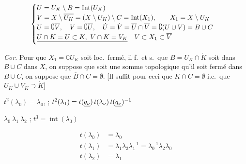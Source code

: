 \documentclass[11pt,a4paper]{article}
\begin{document}
\[
\begin{cases}
U = U_K \setminus B = \operatorname{Int}(U_K) \\
V = X \setminus \overline{U_K} = (X \setminus U_K) \setminus C = \operatorname{Int}(X_1),
\qquad X_1 = X \setminus U_K \\
U = \complement\overline{V}, \quad V = \complement\overline{U}, \quad
\dot{U} = \dot{V} = \overline{U} \cap \overline{V} = \complement(U \cup V) = B \cup C \\
\struck{U \cap K = U \subset K,\ V \cap K = V_K}\quad V \subset X_1 \subset \overline{V}
\end{cases}
\]

\emph{Cor.}  Pour que $X_1 = \complement U_K$
soit loc.\ fermé, il f.\ et s.\ que $B = U_K \cap \dot{K}$ soit
 dans
$B \cup C$ \ill{} dans $X$, \ill{} on suppose que \ill{} soit une somme
\ill{} topologique 
 qu'il soit
fermé dans $B \cup C$, on suppose que $\overline{B} \cap C = \emptyset$.
[Il suffit pour ceci que $\dot{K} \cap C = \emptyset$ i.e.\ que
$U_K \cup V_K \supset \dot{K}$] 


$t^2(\lambda_0) = \lambda_0$, ;
$t^2(\lambda_1) = t(\uncertain{q_\nu})\, t(\lambda_\nu)\, t(\uncertain{q_\nu})^{-1}$

$\lambda_0 \ \lambda_1 \ \lambda_2$ ;
$t^3 = \operatorname{int}(\lambda_0)$

\[
\begin{aligned}
t(\lambda_0) &= \lambda_0 \\
t(\lambda_1) &= \lambda_1 \lambda_2 \lambda_1^{-1} = \lambda_0^{-1} \lambda_2 \lambda_0 \\
t(\lambda_2) &= \lambda_1
\end{aligned}
\]
\end{document}
